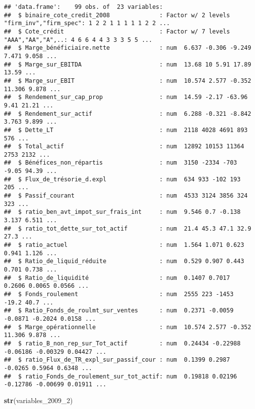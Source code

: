 \documentclass[
]{article}
\newenvironment{Shaded}{\begin{snugshade}}{\end{snugshade}}
\newcommand{\DecValTok}[1]{\textcolor[rgb]{0.00,0.00,0.81}{#1}}
\newcommand{\KeywordTok}[1]{\textcolor[rgb]{0.13,0.29,0.53}{\textbf{#1}}}
\newcommand{\NormalTok}[1]{#1}
\begin{document}
\begin{verbatim}
## 'data.frame':    99 obs. of  23 variables:
##  $ binaire_cote_credit_2008              : Factor w/ 2 levels "firm_inv","firm_spec": 1 2 2 1 1 1 1 1 2 2 ...
##  $ Cote_crédit                           : Factor w/ 7 levels "AAA","AA","A",..: 4 6 6 4 4 3 3 3 5 5 ...
##  $ Marge_bénéficiaire.nette              : num  6.637 -0.306 -9.249 7.471 9.058 ...
##  $ Marge_sur_EBITDA                      : num  13.68 10 5.91 17.89 13.59 ...
##  $ Marge_sur_EBIT                        : num  10.574 2.577 -0.352 11.306 9.878 ...
##  $ Rendement_sur_cap_prop                : num  14.59 -2.17 -63.96 9.41 21.21 ...
##  $ Rendement_sur_actif                   : num  6.288 -0.321 -8.842 3.763 9.899 ...
##  $ Dette_LT                              : num  2118 4028 4691 893 576 ...
##  $ Total_actif                           : num  12892 10153 11364 2753 2132 ...
##  $ Bénéfices_non_répartis                : num  3150 -2334 -703 -9.05 94.39 ...
##  $ Flux_de_trésorie_d.expl               : num  634 933 -102 193 205 ...
##  $ Passif_courant                        : num  4533 3124 3856 324 323 ...
##  $ ratio_ben_avt_impot_sur_frais_int     : num  9.546 0.7 -0.138 3.137 6.511 ...
##  $ ratio_tot_dette_sur_tot_actif         : num  21.4 45.3 47.1 32.9 27.3 ...
##  $ ratio_actuel                          : num  1.564 1.071 0.623 0.941 1.126 ...
##  $ Ratio_de_liquid_réduite               : num  0.529 0.907 0.443 0.701 0.738 ...
##  $ Ratio_de_liquidité                    : num  0.1407 0.7017 0.2606 0.0065 0.0566 ...
##  $ Fonds_roulement                       : num  2555 223 -1453 -19.2 40.7 ...
##  $ Ratio_Fonds_de_roulmt_sur_ventes      : num  0.2371 -0.0059 -0.0871 -0.2024 0.0158 ...
##  $ Marge_opérationnelle                  : num  10.574 2.577 -0.352 11.306 9.878 ...
##  $ ratio_B_non_rep_sur_Tot_actif         : num  0.24434 -0.22988 -0.06186 -0.00329 0.04427 ...
##  $ ratio_Flux_de_TR_expl_sur_passif_cour : num  0.1399 0.2987 -0.0265 0.5964 0.6348 ...
##  $ ratio_Fonds_de_roulement_sur_tot_actif: num  0.19818 0.02196 -0.12786 -0.00699 0.01911 ...
\end{verbatim}

\begin{Shaded}
\begin{Highlighting}[]
\KeywordTok{str}\NormalTok{(variables_}\DecValTok{2009}\NormalTok{_}\DecValTok{2}\NormalTok{)}
\end{Highlighting}
\end{Shaded}
\end{document}
